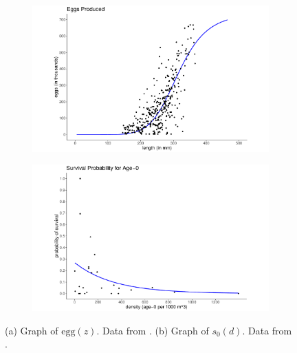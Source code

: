\documentclass[11pt,oneside]{amsart}
\theoremstyle{definition}
\begin{document}
\begin{figure}
\centering
\begin{subfigure}[b]{.43\textwidth}
  \includegraphics[width=\textwidth]{figures/Figure1a.pdf}
  \caption{}
  \label{fig:eggs}
\end{subfigure}
\begin{subfigure}[b]{.43\textwidth}
  \includegraphics[width=\textwidth]{figures/Figure1b.pdf}
  \caption{}
  \label{fig:surv_age0}
\end{subfigure}
\caption{(a) Graph of $\mbox{egg}(z)$. Data from \citep{jons1997ovarian}.  (b) Graph of $s_0(d)$. Data from \citep{michaletz2010overwinter}. }
\label{fig:fecundity}
\end{figure}    
%
\end{document}
